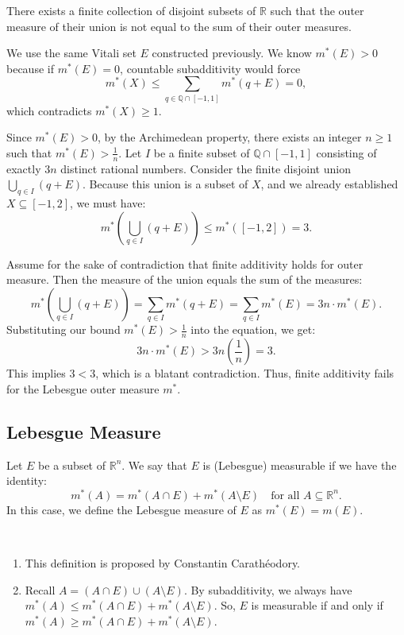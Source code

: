 \begin{proposition}
    There exists a finite collection of disjoint subsets of $\mathbb{R}$ such that the outer measure of their union is not equal to the sum of their outer measures.
\end{proposition}

\begin{pfbox}
    We use the same Vitali set $E$ constructed previously. We know $m^*(E) > 0$ because if $m^*(E) = 0$, countable subadditivity would force 
    $$ m^*(X) \le \sum_{q \in \mathbb{Q} \cap [-1,1]} m^*(q+E) = 0, $$ 
    which contradicts $m^*(X) \ge 1$.
    
    Since $m^*(E) > 0$, by the Archimedean property, there exists an integer $n \ge 1$ such that $m^*(E) > \frac{1}{n}$.
    Let $I$ be a finite subset of $\mathbb{Q} \cap [-1,1]$ consisting of exactly $3n$ distinct rational numbers.
    Consider the finite disjoint union $\bigcup_{q \in I} (q+E)$.
    Because this union is a subset of $X$, and we already established $X \subseteq [-1,2]$, we must have:
    $$ m^*\left(\bigcup_{q \in I} (q+E)\right) \le m^*([-1,2]) = 3. $$
    
    Assume for the sake of contradiction that finite additivity holds for outer measure. Then the measure of the union equals the sum of the measures:
    $$ m^*\left(\bigcup_{q \in I} (q+E)\right) = \sum_{q \in I} m^*(q+E) = \sum_{q \in I} m^*(E) = 3n \cdot m^*(E). $$
    Substituting our bound $m^*(E) > \frac{1}{n}$ into the equation, we get:
    $$ 3n \cdot m^*(E) > 3n \left(\frac{1}{n}\right) = 3. $$
    This implies $3 < 3$, which is a blatant contradiction. 
    Thus, finite additivity fails for the Lebesgue outer measure $m^*$.
\end{pfbox}


\subsection{Lebesgue Measure}

\begin{definition}
    Let $E$ be a subset of $\mathbb{R}^n$. We say that $E$ is (Lebesgue) measurable if we have the identity:
    \[ m^*(A) = m^*(A \cap E) + m^*(A \setminus E) \quad \text{for all } A \subseteq \mathbb{R}^n. \]
    In this case, we define the Lebesgue measure of $E$ as $m^*(E)=m(E).$
\end{definition}

\begin{remark}\ \vspace{-1em}
    \begin{enumerate}
        \item This definition is proposed by Constantin Carath\'eodory.
        \item Recall $A = (A \cap E) \cup (A \setminus E)$. By subadditivity, we always have $m^*(A) \le m^*(A \cap E) + m^*(A \setminus E)$. 
            So, $E$ is measurable if and only if $m^*(A) \ge m^*(A \cap E) + m^*(A \setminus E)$.
    \end{enumerate}
\end{remark}

